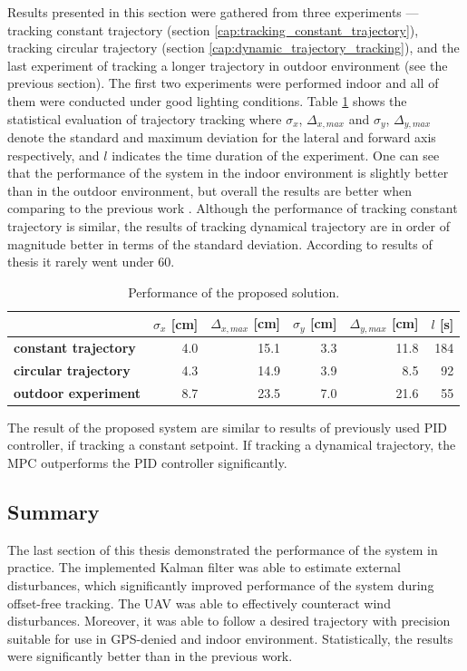 Results presented in this section were gathered from three experiments --- tracking constant trajectory (section \ref{cap:tracking_constant_trajectory}), tracking circular trajectory (section \ref{cap:dynamic_trajectory_tracking}), and the last experiment of tracking a longer trajectory in outdoor environment (see the previous section). The first two experiments were performed indoor and all of them were conducted under good lighting conditions. Table \ref{tab:compparison1} shows the statistical evaluation of trajectory tracking where $\sigma_x$, $\Delta_{x, max}$ and $\sigma_y$, $\Delta_{y, max}$ denote the standard and maximum deviation for the lateral and forward axis respectively, and $l$ indicates the time duration of the experiment. One can see that the performance of the system in the indoor environment is slightly better than in the outdoor environment, but overall the results are better when comparing to the previous work \citep{endrych2014}. Although the performance of tracking constant trajectory is similar, the results of tracking dynamical trajectory are in order of magnitude better in terms of the standard deviation. According to results of thesis \citep{endrych2014} it rarely went under 60. 

\begin{table}[h]
\centering
\begin{tabular}{lrrrrr}
\hline
 & $\sigma_x$ [cm] & $\Delta_{x, max}$ [cm] & $\sigma_y$ [cm] & $\Delta_{y, max}$ [cm] & $l$ [s]\\
\hline
\textbf{constant trajectory} & 4.0 & 15.1 & 3.3 & 11.8 & 184 \\
\textbf{circular trajectory} & 4.3 & 14.9 & 3.9 & 8.5 & 92\\
\textbf{outdoor experiment} & 8.7 & 23.5 & 7.0 & 21.6 & 55\\
\hline
\end{tabular}
\caption{Performance of the proposed solution.}
\label{tab:compparison1}
\end{table}

The result of the proposed system are similar to results of previously used PID controller, if tracking a constant setpoint. If tracking a dynamical trajectory, the MPC outperforms the PID controller significantly.

\subsection{Summary}

The last section of this thesis demonstrated the performance of the system in practice. The implemented Kalman filter was able to estimate external disturbances, which significantly improved performance of the system during offset-free tracking. The UAV was able to effectively counteract wind disturbances. Moreover, it was able to follow a desired trajectory with precision suitable for use in GPS-denied and indoor environment. Statistically, the results were significantly better than in the previous work. 